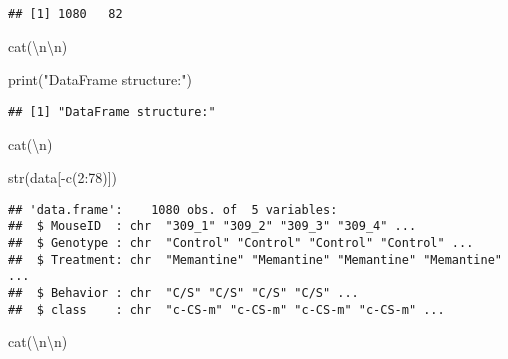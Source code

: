 \documentclass[
]{article}
\newenvironment{Shaded}{\begin{snugshade}}{\end{snugshade}}
\newcommand{\DecValTok}[1]{\textcolor[rgb]{0.00,0.00,0.81}{#1}}
\newcommand{\FunctionTok}[1]{\textcolor[rgb]{0.00,0.00,0.00}{#1}}
\newcommand{\NormalTok}[1]{#1}
\newcommand{\SpecialCharTok}[1]{\textcolor[rgb]{0.00,0.00,0.00}{#1}}
\newcommand{\StringTok}[1]{\textcolor[rgb]{0.31,0.60,0.02}{#1}}
\begin{document}
\begin{verbatim}
## [1] 1080   82
\end{verbatim}

\begin{Shaded}
\begin{Highlighting}[]
\FunctionTok{cat}\NormalTok{(}\StringTok{\textquotesingle{}}\SpecialCharTok{\textbackslash{}n\textbackslash{}n}\StringTok{\textquotesingle{}}\NormalTok{)}
\end{Highlighting}
\end{Shaded}

\begin{Shaded}
\begin{Highlighting}[]
\FunctionTok{print}\NormalTok{(}\StringTok{"DataFrame structure:"}\NormalTok{)}
\end{Highlighting}
\end{Shaded}

\begin{verbatim}
## [1] "DataFrame structure:"
\end{verbatim}

\begin{Shaded}
\begin{Highlighting}[]
\FunctionTok{cat}\NormalTok{(}\StringTok{\textquotesingle{}}\SpecialCharTok{\textbackslash{}n}\StringTok{\textquotesingle{}}\NormalTok{)}
\end{Highlighting}
\end{Shaded}

\begin{Shaded}
\begin{Highlighting}[]
\FunctionTok{str}\NormalTok{(data[}\SpecialCharTok{{-}}\FunctionTok{c}\NormalTok{(}\DecValTok{2}\SpecialCharTok{:}\DecValTok{78}\NormalTok{)])}
\end{Highlighting}
\end{Shaded}

\begin{verbatim}
## 'data.frame':    1080 obs. of  5 variables:
##  $ MouseID  : chr  "309_1" "309_2" "309_3" "309_4" ...
##  $ Genotype : chr  "Control" "Control" "Control" "Control" ...
##  $ Treatment: chr  "Memantine" "Memantine" "Memantine" "Memantine" ...
##  $ Behavior : chr  "C/S" "C/S" "C/S" "C/S" ...
##  $ class    : chr  "c-CS-m" "c-CS-m" "c-CS-m" "c-CS-m" ...
\end{verbatim}

\begin{Shaded}
\begin{Highlighting}[]
\FunctionTok{cat}\NormalTok{(}\StringTok{\textquotesingle{}}\SpecialCharTok{\textbackslash{}n\textbackslash{}n}\StringTok{\textquotesingle{}}\NormalTok{)}
\end{Highlighting}
\end{Shaded}
\end{document}
